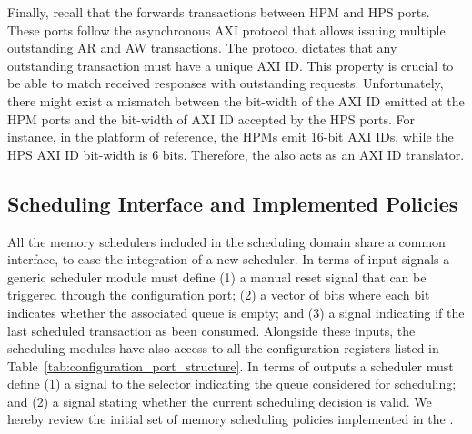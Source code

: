 Finally, recall that the \schim forwards transactions between HPM and
HPS ports. These ports follow the asynchronous AXI protocol that
allows issuing multiple outstanding AR and AW transactions. The
protocol dictates that any outstanding transaction must have a unique
AXI ID. This property is crucial to be able to match received
responses with outstanding requests. Unfortunately, there might exist
a mismatch between the bit-width of the AXI ID emitted at the HPM
ports and the bit-width of AXI ID accepted by the HPS ports. For
instance, in the platform of reference, the HPMs emit 16-bit AXI IDs,
while the HPS AXI ID bit-width is 6 bits. Therefore, the \schim also
acts as an AXI ID translator.




\subsection{Scheduling Interface and Implemented Policies}\label{sec:sched_interf}
All the memory schedulers included in the scheduling domain share a
common interface, to ease the integration of a new scheduler. In terms
of input signals a generic scheduler module must define (1) a manual
reset signal that can be triggered through the configuration port; (2)
a vector of bits where each bit indicates whether the associated queue
is empty; and (3) a signal indicating if the last scheduled
transaction as been consumed. Alongside these inputs, the scheduling
modules have also access to all the configuration registers listed in
Table~\ref{tab:configuration_port_structure}. In terms of outputs a
\schim scheduler must define (1) a signal to the selector indicating
the queue considered for scheduling; and (2) a signal stating whether
the current scheduling decision is valid. We hereby review the initial
set of memory scheduling policies implemented in the \schim.

